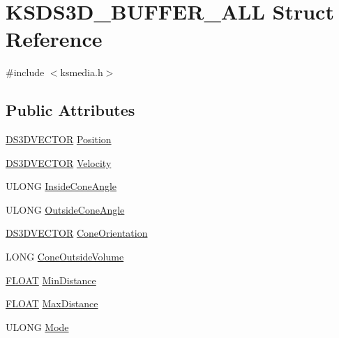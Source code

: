 \hypertarget{struct_k_s_d_s3_d___b_u_f_f_e_r___a_l_l}{}\section{K\+S\+D\+S3\+D\+\_\+\+B\+U\+F\+F\+E\+R\+\_\+\+A\+LL Struct Reference}
\label{struct_k_s_d_s3_d___b_u_f_f_e_r___a_l_l}


{\ttfamily \#include $<$ksmedia.\+h$>$}

\subsection*{Public Attributes}
\begin{DoxyCompactItemize}
\item 
\hyperlink{ksmedia_8h_aec2ed92bfacc9df991ae7ef642c4c18e}{D\+S3\+D\+V\+E\+C\+T\+OR} \hyperlink{struct_k_s_d_s3_d___b_u_f_f_e_r___a_l_l_a86588b9d49cfe2155b9b4423e7631a59}{Position}
\item 
\hyperlink{ksmedia_8h_aec2ed92bfacc9df991ae7ef642c4c18e}{D\+S3\+D\+V\+E\+C\+T\+OR} \hyperlink{struct_k_s_d_s3_d___b_u_f_f_e_r___a_l_l_a157d3439d85db959f452cde65d5a8997}{Velocity}
\item 
U\+L\+O\+NG \hyperlink{struct_k_s_d_s3_d___b_u_f_f_e_r___a_l_l_a1b84fe42a970aaacd22b8a484642f677}{Inside\+Cone\+Angle}
\item 
U\+L\+O\+NG \hyperlink{struct_k_s_d_s3_d___b_u_f_f_e_r___a_l_l_aa7d502d5133ee5a402fe22f7a78889ee}{Outside\+Cone\+Angle}
\item 
\hyperlink{ksmedia_8h_aec2ed92bfacc9df991ae7ef642c4c18e}{D\+S3\+D\+V\+E\+C\+T\+OR} \hyperlink{struct_k_s_d_s3_d___b_u_f_f_e_r___a_l_l_a35ccffa77248baa51a1480f9e4c07068}{Cone\+Orientation}
\item 
L\+O\+NG \hyperlink{struct_k_s_d_s3_d___b_u_f_f_e_r___a_l_l_a153b1b8f03f192e7bd259978b4679280}{Cone\+Outside\+Volume}
\item 
\hyperlink{twolame_2libtwolame_2common_8h_ae8690abbffa85934d64d545920e2b108}{F\+L\+O\+AT} \hyperlink{struct_k_s_d_s3_d___b_u_f_f_e_r___a_l_l_ac82c1f447b3e54c56b41f9b561bc5236}{Min\+Distance}
\item 
\hyperlink{twolame_2libtwolame_2common_8h_ae8690abbffa85934d64d545920e2b108}{F\+L\+O\+AT} \hyperlink{struct_k_s_d_s3_d___b_u_f_f_e_r___a_l_l_aa972f33423362ba384109cb86e54740d}{Max\+Distance}
\item 
U\+L\+O\+NG \hyperlink{struct_k_s_d_s3_d___b_u_f_f_e_r___a_l_l_aae987f7b87b1ad0912b1bcaee29ae1e6}{Mode}
\end{DoxyCompactItemize}



